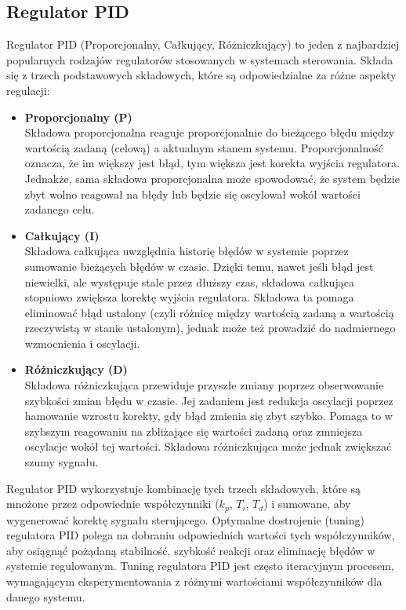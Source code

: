 \documentclass[12pt,a4paper]{article}
\begin{document}
	\subsection{Regulator PID}
 	Regulator PID (Proporcjonalny, Całkujący, Różniczkujący) to jeden z najbardziej popularnych rodzajów regulatorów stosowanych w systemach sterowania. Składa się z trzech podstawowych składowych, które są odpowiedzialne za różne aspekty regulacji: \\
  	\begin{itemize}
		\item \textbf{Proporcjonalny (P)} \\ Składowa proporcjonalna reaguje proporcjonalnie do bieżącego błędu między wartością zadaną (celową) a aktualnym stanem systemu. Proporcjonalność oznacza, że im większy jest błąd, tym większa jest korekta wyjścia regulatora. Jednakże, sama składowa proporcjonalna może spowodować, że system będzie zbyt wolno reagował na błędy lub będzie się oscylował wokół wartości zadanego celu. \\
		\item \textbf{Całkujący (I)} \\ Składowa całkująca uwzględnia historię błędów w systemie poprzez sumowanie bieżących błędów w czasie. Dzięki temu, nawet jeśli błąd jest niewielki, ale występuje stale przez dłuższy czas, składowa całkująca stopniowo zwiększa korektę wyjścia regulatora. Składowa ta pomaga eliminować błąd ustalony (czyli różnicę między wartością zadaną a wartością rzeczywistą w stanie ustalonym), jednak może też prowadzić do nadmiernego wzmocnienia i oscylacji. \\
  		\item \textbf{Różniczkujący (D)} \\ Składowa różniczkująca przewiduje przyszłe zmiany poprzez obserwowanie szybkości zmian błędu w czasie. Jej zadaniem jest redukcja oscylacji poprzez hamowanie wzrostu korekty, gdy błąd zmienia się zbyt szybko. Pomaga to w szybszym reagowaniu na zbliżające się wartości zadaną oraz zmniejsza oscylacje wokół tej wartości. Składowa różniczkująca może jednak zwiększać szumy sygnału.\\
	\end{itemize}
 	Regulator PID wykorzystuje kombinację tych trzech składowych, które są mnożone przez odpowiednie współczynniki ($k_p$, $T_i$, $T_d$) i sumowane, aby wygenerować korektę sygnału sterującego. Optymalne dostrojenie (tuning) regulatora PID polega na dobraniu odpowiednich wartości tych współczynników, aby osiągnąć pożądaną stabilność, szybkość reakcji oraz eliminację błędów w systemie regulowanym. Tuning regulatora PID jest często iteracyjnym procesem, wymagającym eksperymentowania z różnymi wartościami współczynników dla danego systemu.
\end{document}
